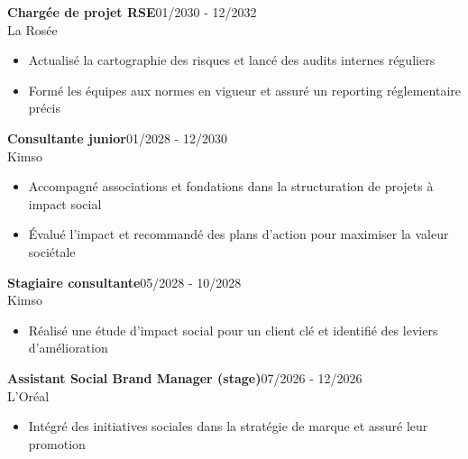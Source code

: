 \documentclass[a4paper]{article}
\renewcommand{\colorbox}[2]{#2}%
\begin{document}
\vspace{3mm}

\colorbox{maincolor}{%
  \begin{minipage}{\linewidth}
    \noindent
    \textbf{Chargée de projet RSE}\hfill 01/2030 - 12/2032\\
    La Rosée\\[-0.3em]
    \begin{itemize}[leftmargin=*]
      \item Actualisé la cartographie des risques et lancé des audits internes réguliers \item Formé les équipes aux normes en vigueur et assuré un reporting réglementaire précis
    \end{itemize}
  \end{minipage}}

\vspace{3mm}

\colorbox{maincolor}{%
  \begin{minipage}{\linewidth}
    \noindent
    \textbf{Consultante junior}\hfill 01/2028 - 12/2030\\
    Kimso\\[-0.3em]
    \begin{itemize}[leftmargin=*]
      \item Accompagné associations et fondations dans la structuration de projets à impact social \item Évalué l’impact et recommandé des plans d’action pour maximiser la valeur sociétale
    \end{itemize}
  \end{minipage}}

\vspace{3mm}

\colorbox{maincolor}{%
  \begin{minipage}{\linewidth}
    \noindent
    \textbf{Stagiaire consultante}\hfill 05/2028 - 10/2028\\
    Kimso\\[-0.3em]
    \begin{itemize}[leftmargin=*]
      \item Réalisé une étude d’impact social pour un client clé et identifié des leviers d’amélioration
    \end{itemize}
  \end{minipage}}

\vspace{3mm}

\colorbox{maincolor}{%
  \begin{minipage}{\linewidth}
    \noindent
    \textbf{Assistant Social Brand Manager (stage)}\hfill 07/2026 - 12/2026\\
    L’Oréal\\[-0.3em]
    \begin{itemize}[leftmargin=*]
      \item Intégré des initiatives sociales dans la stratégie de marque et assuré leur promotion
    \end{itemize}
  \end{minipage}}
\end{document}
